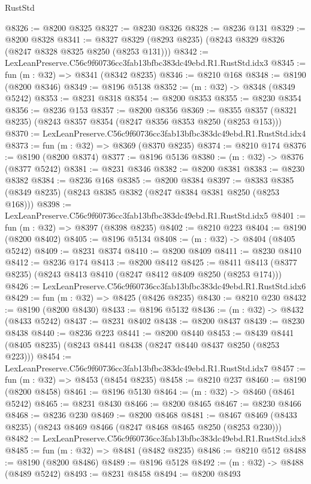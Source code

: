 \begin{lexlean}{RustStd}
\begin{coremodule}
@8326 := @8200 @8325
@8327 := @8230 @8326
@8328 := @8236 @131
@8329 := @8200 @8328
@8341 := @8327 @8329 (@8293 @8235) (@8243 @8329 @8326 (@8247 @8328 @8325 @8250 (@8253 @131)))
@8342 := LexLeanPreserve.C56c9f60736cc3fab13bfbc383dc49ebd.R1.RustStd.idx3
@8345 := fun (m : @32) => @8341 (@8342 @8235)
@8346 := @8210 @168
@8348 := @8190 (@8200 @8346)
@8349 := @8196 @5138
@8352 := (m : @32) -> @8348 (@8349 @5242)
@8353 := @8231 @8318
@8354 := @8200 @8353
@8355 := @8230 @8354
@8356 := @8236 @153
@8357 := @8200 @8356
@8369 := @8355 @8357 (@8321 @8235) (@8243 @8357 @8354 (@8247 @8356 @8353 @8250 (@8253 @153)))
@8370 := LexLeanPreserve.C56c9f60736cc3fab13bfbc383dc49ebd.R1.RustStd.idx4
@8373 := fun (m : @32) => @8369 (@8370 @8235)
@8374 := @8210 @174
@8376 := @8190 (@8200 @8374)
@8377 := @8196 @5136
@8380 := (m : @32) -> @8376 (@8377 @5242)
@8381 := @8231 @8346
@8382 := @8200 @8381
@8383 := @8230 @8382
@8384 := @8236 @168
@8385 := @8200 @8384
@8397 := @8383 @8385 (@8349 @8235) (@8243 @8385 @8382 (@8247 @8384 @8381 @8250 (@8253 @168)))
@8398 := LexLeanPreserve.C56c9f60736cc3fab13bfbc383dc49ebd.R1.RustStd.idx5
@8401 := fun (m : @32) => @8397 (@8398 @8235)
@8402 := @8210 @223
@8404 := @8190 (@8200 @8402)
@8405 := @8196 @5134
@8408 := (m : @32) -> @8404 (@8405 @5242)
@8409 := @8231 @8374
@8410 := @8200 @8409
@8411 := @8230 @8410
@8412 := @8236 @174
@8413 := @8200 @8412
@8425 := @8411 @8413 (@8377 @8235) (@8243 @8413 @8410 (@8247 @8412 @8409 @8250 (@8253 @174)))
@8426 := LexLeanPreserve.C56c9f60736cc3fab13bfbc383dc49ebd.R1.RustStd.idx6
@8429 := fun (m : @32) => @8425 (@8426 @8235)
@8430 := @8210 @230
@8432 := @8190 (@8200 @8430)
@8433 := @8196 @5132
@8436 := (m : @32) -> @8432 (@8433 @5242)
@8437 := @8231 @8402
@8438 := @8200 @8437
@8439 := @8230 @8438
@8440 := @8236 @223
@8441 := @8200 @8440
@8453 := @8439 @8441 (@8405 @8235) (@8243 @8441 @8438 (@8247 @8440 @8437 @8250 (@8253 @223)))
@8454 := LexLeanPreserve.C56c9f60736cc3fab13bfbc383dc49ebd.R1.RustStd.idx7
@8457 := fun (m : @32) => @8453 (@8454 @8235)
@8458 := @8210 @237
@8460 := @8190 (@8200 @8458)
@8461 := @8196 @5130
@8464 := (m : @32) -> @8460 (@8461 @5242)
@8465 := @8231 @8430
@8466 := @8200 @8465
@8467 := @8230 @8466
@8468 := @8236 @230
@8469 := @8200 @8468
@8481 := @8467 @8469 (@8433 @8235) (@8243 @8469 @8466 (@8247 @8468 @8465 @8250 (@8253 @230)))
@8482 := LexLeanPreserve.C56c9f60736cc3fab13bfbc383dc49ebd.R1.RustStd.idx8
@8485 := fun (m : @32) => @8481 (@8482 @8235)
@8486 := @8210 @512
@8488 := @8190 (@8200 @8486)
@8489 := @8196 @5128
@8492 := (m : @32) -> @8488 (@8489 @5242)
@8493 := @8231 @8458
@8494 := @8200 @8493

\end{coremodule}
\end{lexlean}
